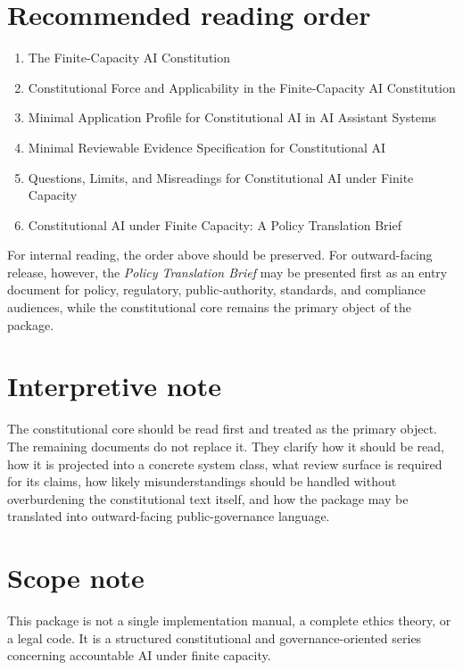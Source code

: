 \documentclass[11pt]{article}
\begin{document}
\section*{Recommended reading order}

\begin{enumerate}[leftmargin=2em]
    \item The Finite-Capacity AI Constitution
    \item Constitutional Force and Applicability in the Finite-Capacity AI Constitution
    \item Minimal Application Profile for Constitutional AI in AI Assistant Systems
    \item Minimal Reviewable Evidence Specification for Constitutional AI
    \item Questions, Limits, and Misreadings for Constitutional AI under Finite Capacity
    \item Constitutional AI under Finite Capacity: A Policy Translation Brief
\end{enumerate}

\noindent For internal reading, the order above should be preserved. For outward-facing release, however, the \emph{Policy Translation Brief} may be presented first as an entry document for policy, regulatory, public-authority, standards, and compliance audiences, while the constitutional core remains the primary object of the package.

\section*{Interpretive note}

The constitutional core should be read first and treated as the primary object. The remaining documents do not replace it. They clarify how it should be read, how it is projected into a concrete system class, what review surface is required for its claims, how likely misunderstandings should be handled without overburdening the constitutional text itself, and how the package may be translated into outward-facing public-governance language.

\section*{Scope note}

This package is not a single implementation manual, a complete ethics theory, or a legal code. It is a structured constitutional and governance-oriented series concerning accountable AI under finite capacity.
\end{document}
